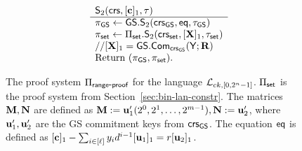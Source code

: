 \begin{figure}
\begin{\algSize}
$$\begin{array}{ll}
\begin{array}{l}
\end{array}
&
\begin{array}{l}
{\mathsf{S}_2(\mathsf{crs},[\mathbf{c}]_1,\tau)}\\
\hline
\pi_{\mathsf{GS}}\gets {\mathsf{GS}}.\mathsf{S}_2(\mathsf{crs}_{\mathsf{GS}},\mathsf{eq},\tau_{\mathsf{GS}})\\
\pi_{\mathsf{set}}\gets \Pi_{\mathsf{set}}.\mathsf{S}_2(\mathsf{crs}_{\mathsf{set}},[\mathbf{{X}}]_1,\tau_{\mathsf{set}})\\
//{[\mathbf{{X}}]_1={\mathsf{GS}}.\mathsf{Com}_{\mathsf{crs}_{\mathsf{GS}}}({\mathbf{{\mathsf{Y}}}};\mathbf{{R}})}\\
\text{Return }  (\pi_{\mathsf{GS}},\pi_{\mathsf{set}}).
\end{array}
\end{array}$$
\end{\algSize}
\caption{The proof system $\Pi_{\mathsf{range}\mbox{-}\mathsf{proof}}$ for the language $\mathcal{L}_{ck,[0,2^n-1]}$. $\Pi_{\mathsf{set}}$ is the proof system from Section~\ref{sec:bin-lan-constr}. The matrices $\mathbf{{M}},\mathbf{{N}}$ are defined as $\mathbf{{M}}:=\mathbf{u}'_1(2^0,2^1,\ldots,2^{m-1}),\mathbf{{N}}:=\mathbf{u}'_2$, where $\mathbf{u}'_1,\mathbf{u}'_2$ are the GS commitment keys from $\mathsf{crs}_{\mathsf{GS}}$. The equation $\mathsf{eq}$ is defined as $[\mathbf{c}]_1-\sum_{i\in[\ell]}{y}_id^{i-1}[\mathbf{u}_1]_1=r[\mathbf{u}_2]_1$.
\label{fig:rp}}
\end{figure}

